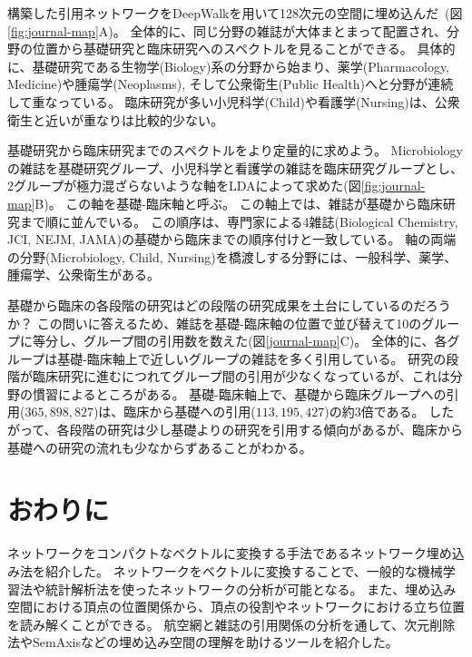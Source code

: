 \documentclass[J]{scitrans}
\begin{document}
構築した引用ネットワークをDeepWalkを用いて128次元の空間に埋め込んだ~(図\ref{fig:journal-map}A)。
全体的に、同じ分野の雑誌が大体まとまって配置され、分野の位置から基礎研究と臨床研究へのスペクトルを見ることができる。
具体的に、基礎研究である生物学(Biology)系の分野から始まり、薬学(Pharmacology, Medicine)や腫瘍学(Neoplasms), そして公衆衛生(Public Health)へと分野が連続して重なっている。
臨床研究が多い小児科学(Child)や看護学(Nursing)は、公衆衛生と近いが重なりは比較的少ない。
 
基礎研究から臨床研究までのスペクトルをより定量的に求めよう。
Microbiologyの雑誌を基礎研究グループ、小児科学と看護学の雑誌を臨床研究グループとし、2グループが極力混ざらないような軸をLDAによって求めた(図\ref{fig:journal-map}B)。
この軸を基礎-臨床軸と呼ぶ。
この軸上では、雑誌が基礎から臨床研究まで順に並んでいる。
この順序は、専門家による4雑誌(Biological Chemistry, JCI, NEJM, JAMA)の基礎から臨床までの順序付けと一致している\cite{Narin1976}。
軸の両端の分野(Microbiology, Child, Nursing)を橋渡しする分野には、一般科学、薬学、腫瘍学、公衆衛生がある。

基礎から臨床の各段階の研究はどの段階の研究成果を土台にしているのだろうか？
この問いに答えるため、雑誌を基礎-臨床軸の位置で並び替えて10のグループに等分し、グループ間の引用数を数えた(図\ref{journal-map}C)。
全体的に、各グループは基礎-臨床軸上で近しいグループの雑誌を多く引用している。
研究の段階が臨床研究に進むにつれてグループ間の引用が少なくなっているが、これは分野の慣習によるところがある。
基礎-臨床軸上で、基礎から臨床グループへの引用($365,898,827$)は、臨床から基礎への引用($113,195,427$)の約3倍である。
したがって、各段階の研究は少し基礎よりの研究を引用する傾向があるが、臨床から基礎への研究の流れも少なからずあることがわかる。

\section{おわりに}

ネットワークをコンパクトなベクトルに変換する手法であるネットワーク埋め込み法を紹介した。
ネットワークをベクトルに変換することで、一般的な機械学習法や統計解析法を使ったネットワークの分析が可能となる。
また、埋め込み空間における頂点の位置関係から、頂点の役割やネットワークにおける立ち位置を読み解くことができる。
航空網と雑誌の引用関係の分析を通して、次元削除法やSemAxisなどの埋め込み空間の理解を助けるツールを紹介した。
\end{document}
